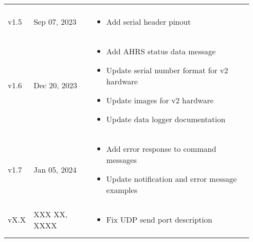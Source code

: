 \begin{longtable}{| >{\centering}p{} | p{} | >{\raggedright\arraybackslash}p{} |}
\begin{itemize}
        \end{itemize}\\
        v1.5 & Sep 07, 2023 &
        \begin{itemize}
            \item Add serial header pinout
        \end{itemize}\\
        v1.6 & Dec 20, 2023 &
        \begin{itemize}
            \item Add \acs{AHRS} status data message
            \item Update serial number format for v2 hardware
            \item Update images for v2 hardware
            \item Update data logger documentation
        \end{itemize}\\
        v1.7 & Jan 05, 2024 &
        \begin{itemize}
            \item Add error response to command messages
            \item Update notification and error message examples
        \end{itemize}\\
        vX.X & XXX XX, XXXX &
        \begin{itemize}
            \item Fix \acs{UDP} send port description
        \end{itemize}\\
        \arrayrulecolor{gray!50}\hline
    \end{longtable}
\endgroup

